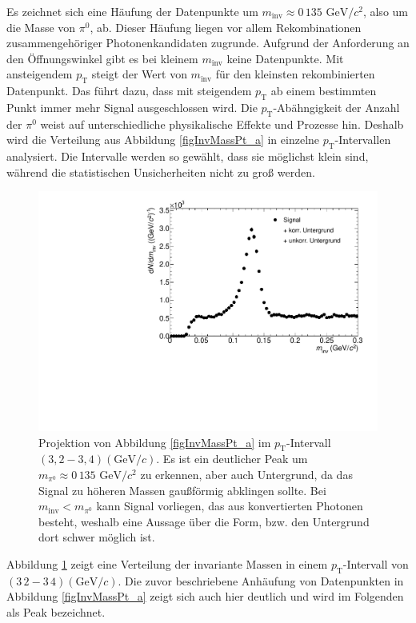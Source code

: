 Es zeichnet sich eine H\"aufung der Datenpunkte um $m_{\text{inv}}\approx 0\,135\text{ GeV}/c^{2}$, also um die Masse von $\pi^{0}$, ab.
Dieser H\"aufung liegen vor allem Rekombinationen zusammengeh\"origer Photonenkandidaten zugrunde.
Aufgrund der Anforderung an den \"Offnungswinkel gibt es bei kleinem $m_{\text{inv}}$ keine Datenpunkte.
Mit ansteigendem $p_{\text{T}}$ steigt der Wert von $m_{\text{inv}}$ f\"ur den kleinsten rekombinierten Datenpunkt.
Das f\"uhrt dazu, dass mit steigendem $p_{\text{T}}$ ab einem bestimmten Punkt immer mehr Signal ausgeschlossen wird.
\newline
Die $p_{\text{T}}$-Ab\"ahngigkeit der Anzahl der $\pi^{0}$ weist auf unterschiedliche physikalische Effekte und Prozesse hin.
Deshalb wird die Verteilung aus Abbildung \ref{figInvMassPt_a} in einzelne $p_{\text{T}}$-Intervallen analysiert.
Die Intervalle werden so gew{\"a}hlt, dass sie m{\"o}glichst klein sind, w{\"a}hrend die statistischen Unsicherheiten nicht zu gro{\ss} werden.
\begin{figure}[tbp]
\centering
\includegraphics[width=.75\linewidth]{hSignalPlusBkg.pdf}
\caption{Projektion von Abbildung \ref{figInvMassPt_a} im $p_{\text{T}}$-Intervall $(3,2 - 3,4) (\text{GeV/}c)$. Es ist ein deutlicher Peak um $m_{\pi^{0}} \approx 0\,135\text{ GeV/}c^{2}$ zu erkennen, aber auch Untergrund, da das Signal zu h{\"o}heren Massen gau{\ss}f{\"o}rmig abklingen sollte. Bei $m_{\text{inv}} < m_{\pi^{0}}$ kann Signal vorliegen, das aus konvertierten Photonen besteht, weshalb eine Aussage {\"u}ber die Form, bzw. den Untergrund dort schwer m{\"o}glich ist.}
\label{figSignalPlusBkg}
\end{figure}
\newline
Abbildung \ref{figSignalPlusBkg} zeigt eine Verteilung der invariante Massen in einem $p_{\text{T}}$-Intervall von $(3\,2 - 3\,4)(\text{GeV}/c)$.
Die zuvor beschriebene Anh\"aufung von Datenpunkten in Abbildung \ref{figInvMassPt_a} zeigt sich auch hier deutlich und wird im Folgenden als Peak bezeichnet.
